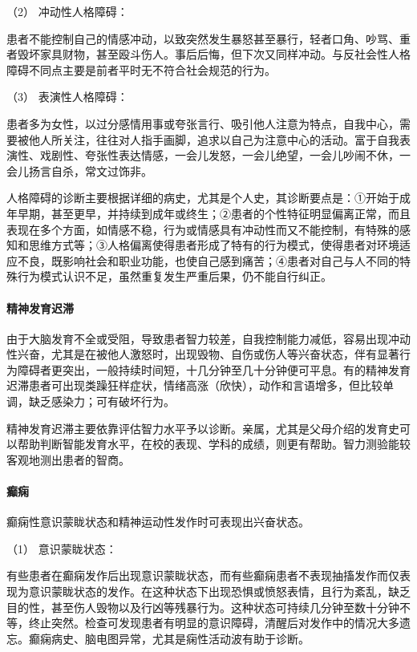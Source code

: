 \hypertarget{text00043.htmlux5cux23CHP1-18-1-2-5-2}{}
（2） 冲动性人格障碍：

患者不能控制自己的情感冲动，以致突然发生暴怒甚至暴行，轻者口角、吵骂、重者毁坏家具财物，甚至殴斗伤人。事后后悔，但下次又同样冲动。与反社会性人格障碍不同点主要是前者平时无不符合社会规范的行为。

\hypertarget{text00043.htmlux5cux23CHP1-18-1-2-5-3}{}
（3） 表演性人格障碍：

患者多为女性，以过分感情用事或夸张言行、吸引他人注意为特点，自我中心，需要被他人所关注，往往对人指手画脚，追求以自己为注意中心的活动。富于自我表演性、戏剧性、夸张性表达情感，一会儿发怒，一会儿绝望，一会儿吵闹不休，一会儿扬言自杀，常文过饰非。

人格障碍的诊断主要根据详细的病史，尤其是个人史，其诊断要点是：①开始于成年早期，甚至更早，并持续到成年或终生；②患者的个性特征明显偏离正常，而且表现在多个方面，如情感不稳，行为或情感具有冲动性而又不能控制，有特殊的感知和思维方式等；③人格偏离使得患者形成了特有的行为模式，使得患者对环境适应不良，既影响社会和职业功能，也使自己感到痛苦；④患者对自己与人不同的特殊行为模式认识不足，虽然重复发生严重后果，仍不能自行纠正。

\paragraph{精神发育迟滞}

由于大脑发育不全或受阻，导致患者智力较差，自我控制能力减低，容易出现冲动性兴奋，尤其是在被他人激怒时，出现毁物、自伤或伤人等兴奋状态，伴有显著行为障碍者更突出，一般持续时间短，十几分钟至几十分钟便可平息。有的精神发育迟滞患者可出现类躁狂样症状，情绪高涨（欣快），动作和言语增多，但比较单调，缺乏感染力；可有破坏行为。

精神发育迟滞主要依靠评估智力水平予以诊断。亲属，尤其是父母介绍的发育史可以帮助判断智能发育水平，在校的表现、学科的成绩，则更有帮助。智力测验能较客观地测出患者的智商。

\paragraph{癫痫}

癫痫性意识蒙眬状态和精神运动性发作时可表现出兴奋状态。

\hypertarget{text00043.htmlux5cux23CHP1-18-1-2-7-1}{}
（1） 意识蒙眬状态：

有些患者在癫痫发作后出现意识蒙眬状态，而有些癫痫患者不表现抽搐发作而仅表现为意识蒙眬状态的发作。在这种状态下出现恐惧或愤怒表情，且行为紊乱，缺乏目的性，甚至伤人毁物以及行凶等残暴行为。这种状态可持续几分钟至数十分钟不等，终止突然。检查可发现患者有明显的意识障碍，清醒后对发作中的情况大多遗忘。癫痫病史、脑电图异常，尤其是痫性活动波有助于诊断。

